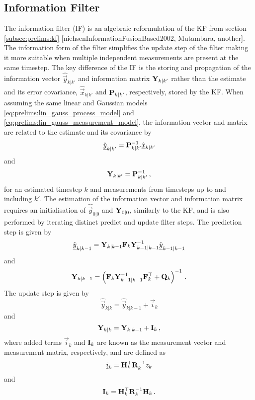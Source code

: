 \subsection{Information Filter}\label{subsec:prelims:if}
The information filter (IF) is an algebraic reformulation of the KF from section \ref{subsec:prelims:kf} [niehsenInformationFusionBased2002, Mutambara, another]. The information form of the filter simplifies the update step of the filter making it more suitable when multiple independent measurements are present at the same timestep. The key difference of the IF is the storing and propagation of the information vector $\hat{\vec{y}}_{k|k'}$ and information matrix ${{\mathbf{Y}}}_{k|k'}$ rather than the estimate and its error covariance, $\hat{\vec{x}}_{k|k'}$ and ${{\mathbf{P}}}_{k|k'}$, respectively, stored by the KF. When assuming the same linear and Gaussian models \eqref{eq:prelims:lin_gauss_process_model} and \eqref{eq:prelims:lin_gauss_measurement_model}, the information vector and matrix are related to the estimate and its covariance by
\begin{equation}\label{eq:prelims:info_vec_defn}
    \hat{{\underline{y}}}_{k|k'} = {{\mathbf{P}}}_{k|k'}^{-1}\hat{{\underline{x}}}_{k|k'}
\end{equation}
and
\begin{equation}\label{eq:prelims:info_mat_defn}
    {\ensuremath{{\mathbf{Y}}}}_{k|k'} = {{\mathbf{P}}}_{k|k'}^{-1}\,,
\end{equation}
for an estimated timestep $k$ and measurements from timesteps up to and including $k'$. The estimation of the information vector and information matrix requires an initialisation of $\hat{\vec{y}}_{0|0}$ and ${{\mathbf{Y}}}_{0|0}$, similarly to the KF, and is also performed by iterating distinct predict and update filter steps. The prediction step is given by
\begin{equation}\label{eq:prelims:if_info_vec_predict}
    \hat{{\underline{y}}}_{k|k-1} = {{\mathbf{Y}}}_{k|k-1}{{\mathbf{F}}}_k{{\mathbf{Y}}}_{k-1|k-1}^{-1}\hat{{\underline{y}}}_{k-1|k-1}
\end{equation}
and
\begin{equation}\label{eq:prelims:if_info_mat_predict}
    {\ensuremath{{\mathbf{Y}}}}_{k|k-1} = \left({{\mathbf{F}}}_k{{\mathbf{Y}}}_{k-1|k-1}^{-1}{{\mathbf{F}}}_k^\top + {{\mathbf{Q}}}_k\right)^{-1}\,.
\end{equation}
The update step is given by
\begin{equation}\label{eq:prelims:if_info_vec_update_single}
    \hat{\vec{y}}_{k|k} = \hat{\vec{y}}_{k|k-1} + \vec{i}_k
\end{equation}
and
\begin{equation}\label{eq:prelims:if_info_mat_update_single}
    {\ensuremath{{\mathbf{Y}}}}_{k|k} = {{\mathbf{Y}}}_{k|k-1} + {{\mathbf{I}}}_k\,,
\end{equation}
where added terms $\vec{i}_k$ and ${{\mathbf{I}}}_k$ are known as the measurement vector and measurement matrix, respectively, and are defined as
\begin{equation}
    {\underline{i}}_k = {{\mathbf{H}}}_k^\top{\ensuremath{{\mathbf{R}}}}_k^{-1}z_k
\end{equation}
and
\begin{equation}
    {\ensuremath{{\mathbf{I}}}}_k = {{\mathbf{H}}}_k^\top{\ensuremath{{\mathbf{R}}}}_k^{-1}{{\mathbf{H}}}_k\,.
\end{equation}

